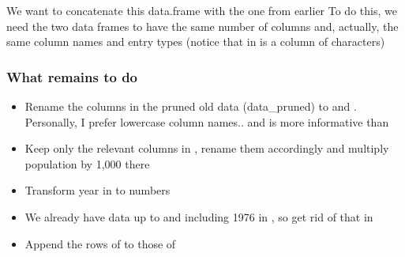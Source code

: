 \documentclass[aspectratio=169]{beamer}\usepackage[]{graphicx}\usepackage[]{xcolor}
\makeatletter
\newcommand{\hlnum}[1]{\textcolor[rgb]{0.686,0.059,0.569}{#1}}%
\newcommand{\hlsng}[1]{\textcolor[rgb]{0.192,0.494,0.8}{#1}}%
\newcommand{\hlopt}[1]{\textcolor[rgb]{0,0,0}{#1}}%
\newcommand{\hldef}[1]{\textcolor[rgb]{0.345,0.345,0.345}{#1}}%
\newcommand{\hlkwb}[1]{\textcolor[rgb]{0.69,0.353,0.396}{#1}}%
\newcommand{\hlkwd}[1]{\textcolor[rgb]{0.737,0.353,0.396}{\textbf{#1}}}%
\newenvironment{kframe}{%
 \def\at@end@of@kframe{}%
 \ifinner\ifhmode%
  \def\at@end@of@kframe{\end{minipage}}%
  \begin{minipage}{\columnwidth}%
 \fi\fi%
 \def\FrameCommand##1{\hskip\@totalleftmargin \hskip-\fboxsep
 \colorbox{shadecolor}{##1}\hskip-\fboxsep
     \hskip-\linewidth \hskip-\@totalleftmargin \hskip\columnwidth}%
 \MakeFramed {\advance\hsize-\width
   \@totalleftmargin\z@ \linewidth\hsize
   \@setminipage}}%
 {\par\unskip\endMakeFramed%
 \at@end@of@kframe}
\newenvironment{knitrout}{}{} %
\makeatother
\begin{document}
\begin{frame}
We want to concatenate this data.frame with the one from earlier
\vfill
To do this, we need the two data frames to have the same number of columns and, actually, the same column names and entry types (notice that  in  is a column of characters)
\end{frame}

\begin{frame}\frametitle{What remains to do}
\begin{itemize}
\item Rename the columns in the pruned old data (data\_pruned) to  and . Personally, I prefer lowercase column names.. and  is more informative than 
\item Keep only the relevant columns in , rename them accordingly and multiply population by 1,000 there
\item Transform year in  to numbers
\item We already have data up to and including 1976 in , so get rid of that in 
\item Append the rows of  to those of 
\end{itemize}
\end{frame}


\end{document}

